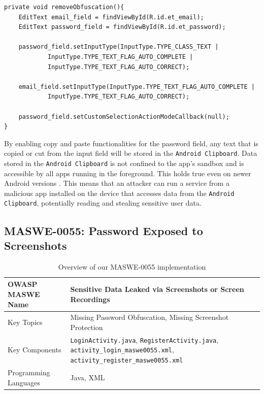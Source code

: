 \begin{lstlisting}[style=JavaStyle, float=tbh, captionpos=b, caption={Removing text obfuscation and adding auto complete and auto correct flags for user input fields}, label={lst:Maswe0053ObfuscationRemoved}]
private void removeObfuscation(){
    EditText email_field = findViewById(R.id.et_email);
    EditText password_field = findViewById(R.id.et_password);

    password_field.setInputType(InputType.TYPE_CLASS_TEXT |
            InputType.TYPE_TEXT_FLAG_AUTO_COMPLETE |
            InputType.TYPE_TEXT_FLAG_AUTO_CORRECT);

    email_field.setInputType(InputType.TYPE_TEXT_FLAG_AUTO_COMPLETE |
            InputType.TYPE_TEXT_FLAG_AUTO_CORRECT);

    password_field.setCustomSelectionActionModeCallback(null);
}
\end{lstlisting}

By enabling copy and paste functionalities for the password field, any text that is copied or cut from the input field will be stored in the \texttt{Android Clipboard}. Data stored in the \texttt{Android Clipboard} is not confined to the app's sandbox and is accessible by all apps running in the foreground. This holds true even on newer Android versions \cite{secure_clipboard_handling}. This means that an attacker can run a service from a malicious app installed on the device that accesses data from the \texttt{Android Clipboard}, potentially reading and stealing sensitive user data.

\subsection{MASWE-0055: Password Exposed to Screenshots}
\label{subsec:maswe-0055}

\begin{table}[H]
    \centering
    \renewcommand{\arraystretch}{1.3}
        \begin{tabular}{p{5cm} p{8cm}} 
        \toprule
        OWASP MASWE Name & Sensitive Data Leaked via Screenshots or Screen Recordings \\ 
        \midrule
        Key Topics & Missing Password Obfuscation, Missing Screenshot Protection \\
        Key Components & \texttt{LoginActivity.java}, \texttt{RegisterActivity.java}, \texttt{activity\_login\_maswe0055.xml}, \texttt{activity\_register\_maswe0055.xml} \\
        Programming Languages & Java, XML \\ 
        \bottomrule
        \end{tabular}
    \caption{Overview of our MASWE-0055 implementation}
    \label{tab:maswe-0055}
\end{table}

